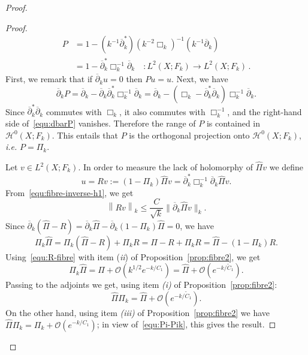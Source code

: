\documentclass{article}
\newcommand{\norm}[1]{\left\|#1\right\|}
\newcommand{\tnorm}[1]{\|#1\|}
\newcommand{\dbar}{\overline\partial}
\renewcommand{\O}{\mathcal{O}}
\begin{document}
\begin{proof}
\begin{proof}
\begin{align}
      P & = 1 - (k^{-1}\dbar_k^*) (k^{-2}\Box_k)^{-1} (k^{-1}\dbar_k) \\
        & =
          1 - \dbar_k^* \Box_k^{-1} \dbar_k \quad : L^2(X;F_k) \to L^2(X;F_k)\,.
          \label{eq:1}
    \end{align}
    First, we remark that if $\dbar_k u = 0$ then $Pu = u$.  Next, we
    have
    \begin{equation}
      \label{equ:dbarP}
      \dbar_k P = \dbar_k - \dbar_k \dbar_k^* \Box_k^{-1} \dbar_k 
      =  \dbar_k - (\Box_k - \dbar_k^*\dbar_k) \Box_k^{-1} \dbar_k.
    \end{equation}
    Since $\dbar_k^*\dbar_k$ commutes with $\Box_k$, it also commutes
    with $\Box_k^{-1}$, and the right-hand side of~\eqref{equ:dbarP}
    vanishes.  Therefore the range of $P$ is contained in
    $\mathcal{H}^0(X;F_k)$.  This entails that $P$ is the orthogonal
    projection onto $\mathcal{H}^0(X;F_k)$, \emph{i.e.} $P=\Pi_k$.

    Let $v\in L^2(X;F_k)$. In order to measure the lack of holomorphy
    of $\hat\Pi v$ we define
    \[
    u = Rv := (1-\Pi_k)\hat\Pi v = \dbar_k^* \Box_k^{-1} \dbar_k
    \hat\Pi v.
    \]
    From~\eqref{equ:fibre-inverse-h1}, we get
    \begin{equation}
      \label{equ:R-fibre}
      \norm{R v}_k \leq \frac{C}{\sqrt k} \tnorm{\dbar_k \hat\Pi v}_k.
    \end{equation}
    Since
    $\dbar_k (\hat\Pi - R ) = \dbar_k \hat\Pi - \dbar_k(1-\Pi_k)\hat
    \Pi = 0$, we have
    \[
    \Pi_k \hat\Pi = \Pi_k(\hat{\Pi}-R) + \Pi_k R = \hat{\Pi}-R + \Pi_k
    R = \hat\Pi - (1-\Pi_k)R.
    \]
    Using~\eqref{equ:R-fibre} with item (\emph{ii}) of
    Proposition~\ref{prop:fibre2}, we get
    \[
    \Pi_k \hat\Pi = \hat \Pi + \O(k^{1/2}e^{-k/C_1}) = \hat \Pi + \O(e^{-k/\tilde C_1}).
    \]
    Passing to the adjoints we get, using item \emph{(i)} of
    Proposition~\ref{prop:fibre2}:
    \begin{equation}
      \label{equ:Pi-Pik}
      \hat\Pi\Pi_k = \hat\Pi +\O(e^{-k/\tilde C_1}).
    \end{equation}
    On the other hand, using item \emph{(iii)} of
    Proposition~\ref{prop:fibre2} we have
    $\hat\Pi\Pi_k = \Pi_k +\O(e^{-k/C_1})$; in view
    of~\eqref{equ:Pi-Pik}, this gives the result.
  \end{proof}


\end{proof}
\end{document}
